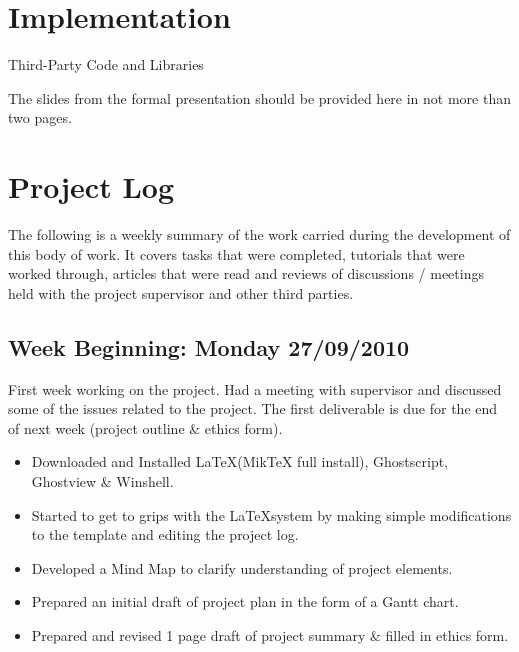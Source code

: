 \chapter{Implementation}

Third-Party Code and Libraries

The slides from the formal presentation should be provided here in not more than two pages. 

\chapter{Project Log}

The following is a weekly summary of the work carried during the development of this body of work. It covers tasks that were completed, tutorials that were worked through, articles that were read and reviews of discussions / meetings held with the project supervisor and other third parties. 

\section*{Week Beginning: Monday 27/09/2010}

First week working on the project. Had a meeting with supervisor and discussed some of the issues related to the project. The first deliverable is due for the end of next week (project outline \& ethics form). 

\begin{itemize}
  \item Downloaded and Installed \LaTeX \space (MikTeX full install), Ghostscript, Ghostview \& Winshell. 
  \item Started to get to grips with the \LaTeX \space system by making simple modifications to the template and editing the project log.
  \item Developed a Mind Map to clarify understanding of project elements.
  \item Prepared an initial draft of project plan in the form of a Gantt chart. 
  \item Prepared and revised 1 page draft of project summary \& filled in ethics form. 
\end{itemize}




